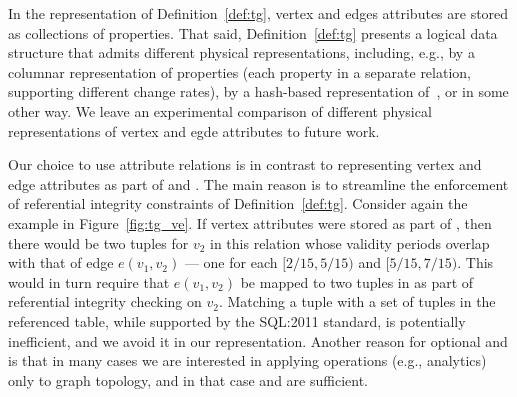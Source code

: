 In the \tg representation of Definition~\ref{def:tg}, vertex and edges
attributes are stored as collections of properties.  That said,
Definition~\ref{def:tg} presents a logical data structure that admits
different physical representations, including, e.g., by a columnar
representation of properties (each property in a separate relation,
supporting different change rates), by a hash-based representation
of~\cite{DBLP:conf/sigmod/SunFSKHX15}, or in some other way. We leave
an experimental comparison of different physical representations of
vertex and egde attributes to future work.


Our choice to use attribute relations is in contrast to representing
vertex and edge attributes as part of \tv and \te.  The main reason is
to streamline the enforcement of referential integrity constraints of
Definition~\ref{def:tg}.  Consider again the example in
Figure~\ref{fig:tg_ve}.  If vertex attributes were stored as part of
\tv, then there would be two tuples for $v_2$ in this relation whose
validity periods overlap with that of edge $e(v_1, v_2)$ --- one for
each $[2/15, 5/15)$ and $[5/15, 7/15)$.  This would in turn require
    that $e(v_1, v_2)$ be mapped to two tuples in \tv as part of
    referential integrity checking on $v_2$.  Matching a tuple with a
    set of tuples in the referenced table, while supported by the
    SQL:2011 standard, is potentially inefficient, and we avoid it in
    our representation.
%
Another reason for optional \tav and \tae is
that in many cases we are interested in applying operations (e.g.,
analytics) only to graph topology, and in that case \tv and \te are
sufficient.
%

